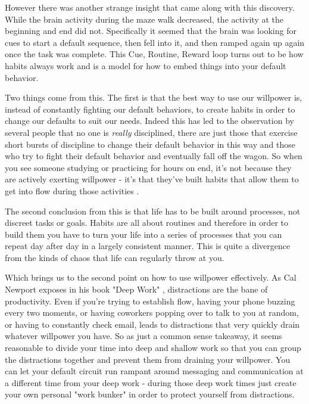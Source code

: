 \documentclass[11pt,a5paper]{book}
\begin{document}
However there was another strange insight that came along with this discovery. While the brain activity during the maze walk decreased, the activity at the beginning and end did not. Specifically it seemed that the brain was looking for cues to start a default sequence, then fell into it, and then ramped again up again once the task was complete. This Cue, Routine, Reward loop turns out to be how habits always work \cite{duhigg} and is a model for how to embed things into your default behavior. 
\newline

Two things come from this. The first is that the best way to use our willpower is, instead of constantly fighting our default behaviors, to  create habits in order to change our defaults to suit our needs. Indeed this has led to the observation by several people that no one is \textit{really} disciplined, there are just those that exercise short bursts of discipline to change their default behavior in this way and those who try to fight their default behavior and eventually fall off the wagon. So when you see someone studying or practicing for hours on end, it's not because they are actively exerting willpower - it's that they've built habits that allow them to get into flow during those activities \cite{keller}. 
\newline

The second conclusion from this is that life has to be built around processes, not discreet tasks or goals. Habits are all about routines and therefore in order to build them you have to turn your life into a series of processes that you can repeat day after day in a largely consistent manner. This is quite a divergence from the kinds of chaos that life can regularly throw at you.
\newline

Which brings us to the second point on how to use willpower effectively. As Cal Newport exposes in his book "Deep Work" \cite{newport}, distractions are the bane of productivity. Even if you're trying to establish flow, having your phone buzzing every two moments, or having coworkers popping over to talk to you at random, or having to constantly check email, leads to distractions that very quickly drain whatever willpower you have. So as just a common sense takeaway, it seems reasonable to divide your time into deep and shallow work so that you can group the distractions together and prevent them from draining your willpower. You can let your default circuit run rampant around messaging and communication at a different time from your deep work - during those deep work times just create your own personal "work bunker" \cite{newport} in order to protect yourself from distractions.
\newline
\end{document}

